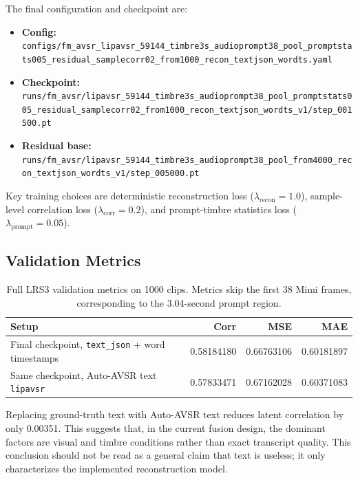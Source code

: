 \documentclass{article}
\begin{document}
The final configuration and checkpoint are:
\begin{itemize}
    \item \textbf{Config:} \texttt{configs/fm\_avsr\_lipavsr\_59144\_timbre3s\_audioprompt38\_pool\_promptstats005\_residual\_samplecorr02\_from1000\_recon\_textjson\_wordts.yaml}
    \item \textbf{Checkpoint:} \texttt{runs/fm\_avsr/lipavsr\_59144\_timbre3s\_audioprompt38\_pool\_promptstats005\_residual\_samplecorr02\_from1000\_recon\_textjson\_wordts\_v1/step\_001500.pt}
    \item \textbf{Residual base:} \texttt{runs/fm\_avsr/lipavsr\_59144\_timbre3s\_audioprompt38\_pool\_from4000\_recon\_textjson\_wordts\_v1/step\_005000.pt}
\end{itemize}

Key training choices are deterministic reconstruction loss
($\lambda_{\mathrm{recon}}=1.0$), sample-level correlation loss
($\lambda_{\mathrm{corr}}=0.2$), and prompt-timbre statistics loss
($\lambda_{\mathrm{prompt}}=0.05$).

\subsection{Validation Metrics}

\begin{table}[h]
\centering
\small
\begin{tabular}{@{}lrrr@{}}
\toprule
\textbf{Setup} & \textbf{Corr} & \textbf{MSE} & \textbf{MAE} \\
\midrule
Final checkpoint, \texttt{text\_json} + word timestamps
    & 0.58184180 & 0.66763106 & 0.60181897 \\
Same checkpoint, Auto-AVSR text \texttt{lipavsr}
    & 0.57833471 & 0.67162028 & 0.60371083 \\
\bottomrule
\end{tabular}
\caption{Full LRS3 validation metrics on 1000 clips. Metrics skip the first 38
Mimi frames, corresponding to the 3.04-second prompt region.}
\label{tab:val}
\end{table}

Replacing ground-truth text with Auto-AVSR text reduces latent correlation by
only 0.00351. This suggests that, in the current fusion design, the dominant
factors are visual and timbre conditions rather than exact transcript quality.
This conclusion should not be read as a general claim that text is useless; it
only characterizes the implemented reconstruction model.
\end{document}
